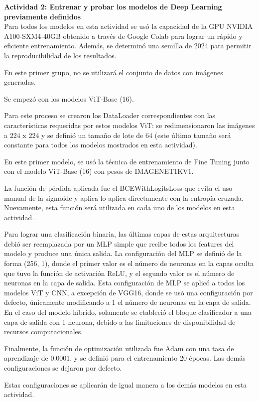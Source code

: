 \textbf{Actividad 2: Entrenar y probar los modelos de Deep Learning previamente definidos}
\\
Para todos los modelos en esta actividad se usó la capacidad de la GPU NVIDIA A100-SXM4-40GB obtenido a través de Google Colab para lograr un rápido y eficiente entrenamiento. Además, se determinó una semilla de 2024 para permitir la reproducibilidad de los resultados.

En este primer grupo, no se utilizará el conjunto de datos con imágenes generadas.

Se empezó con los modelos ViT-Base (16).

Para este proceso se crearon los DataLoader correspondientes con las características requeridas por estos modelos ViT: se redimensionaron las imágenes a 224 x 224 y se definió un tamaño de lote de 64 (este último tamaño será constante para todos los modelos mostrados en esta actividad).

En este primer modelo, se usó la técnica de entrenamiento de Fine Tuning junto con el modelo ViT-Base (16) con pesos de IMAGENET1KV1.

La función de pérdida aplicada fue el BCEWithLogitsLoss que evita el uso manual de la sigmoide y aplica lo aplica directamente con la entropía cruzada. Nuevamente, esta función será utilizada en cada uno de los modelos en esta actividad.

Para lograr una clasificación binaria, las últimas capas de estas arquitecturas debió ser reemplazada por un MLP simple que recibe todos los features del modelo y produce una única salida. La configuración del MLP se definió de la forma (256, 1), donde el primer valor es el número de neuronas en la capas oculta que tuvo la función de activación ReLU, y el segundo valor es el número de neuronas en la capa de salida. Esta configuración de MLP se aplicó a todos los modelos ViT y CNN, a excepción de VGG16, donde se usó una configuración por defecto, únicamente modificando a 1 el número de neuronas en la capa de salida. En el caso del modelo híbrido, solamente se etableció el bloque clasificador a una capa de salida con 1 neurona, debido a las limitaciones de disponibilidad de recursos computacionales.

Finalmente, la función de optimización utilizada fue Adam con una tasa de aprendizaje de 0.0001, y se definió para el entrenamiento 20 épocas. Las demás configuraciones se dejaron por defecto.

Estas configuraciones se aplicarán de igual manera a los demás modelos en esta actividad.

